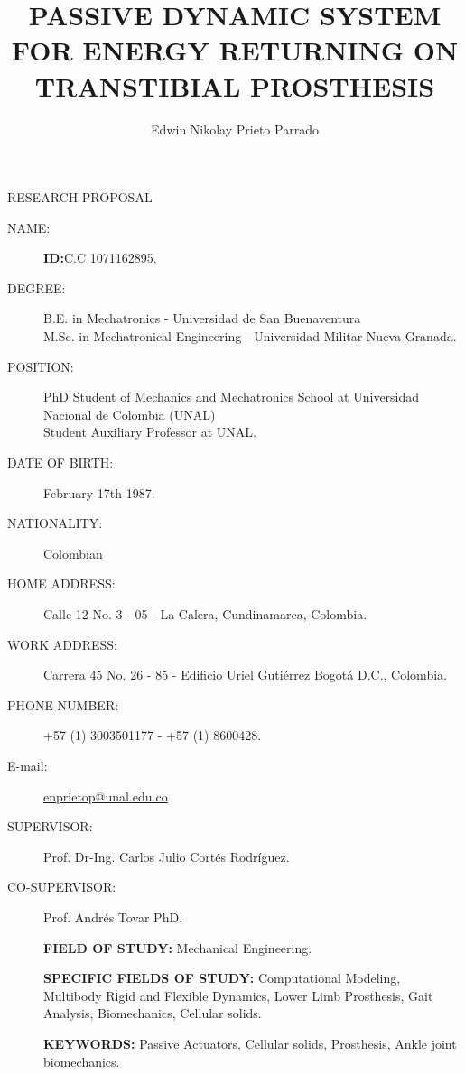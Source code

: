 \documentclass[12pt,english]{article}
\begin{document}
\title{PASSIVE DYNAMIC SYSTEM FOR ENERGY RETURNING ON TRANSTIBIAL PROSTHESIS}
\maketitle

\begin{center}
RESEARCH PROPOSAL 
\par\end{center}

\begin{description}
\item [{NAME:}] \author{Edwin Nikolay Prieto Parrado} \textbf{ID:}C.C 1071162895.
\item [{DEGREE:}] B.E. in Mechatronics - Universidad de San Buenaventura \\ M.Sc. in Mechatronical Engineering - Universidad Militar Nueva Granada.
\item[{POSITION: }] PhD Student of Mechanics and Mechatronics School at Universidad Nacional de Colombia (UNAL) \\ Student Auxiliary Professor at UNAL.
\item[{DATE OF BIRTH: }] February 17th 1987.
\item[{NATIONALITY: }] Colombian
\item[{HOME ADDRESS: }] Calle 12 No. 3 - 05 - La Calera, Cundinamarca, Colombia.
\item[{WORK ADDRESS: }] Carrera 45 No. 26 - 85 - Edificio Uriel Gutiérrez
Bogotá D.C.,  Colombia.
\item[{PHONE NUMBER: }] +57 (1) 3003501177 - +57 (1) 8600428.
\item[{E-mail: }] \href{mailto:enprietop@unal.edu.co}{  enprietop@unal.edu.co}


\item [{SUPERVISOR:}] Prof. Dr-Ing. Carlos Julio Cortés Rodríguez.
\item [{CO-SUPERVISOR:}]  Prof. Andrés Tovar PhD.

\textbf{FIELD OF STUDY: } Mechanical Engineering.

 \textbf{SPECIFIC FIELDS OF STUDY:} Computational Modeling, Multibody Rigid and Flexible Dynamics, Lower Limb Prosthesis, Gait Analysis, Biomechanics, Cellular solids.

\textbf{KEYWORDS:} Passive Actuators, Cellular solids, Prosthesis, Ankle joint biomechanics.


\end{description}
\end{document}
